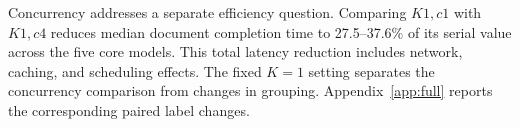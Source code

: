 Concurrency addresses a separate efficiency question. Comparing $K1,c1$ with $K1,c4$ reduces median document completion time to 27.5--37.6\% of its serial value across the five core models. This total latency reduction includes network, caching, and scheduling effects. The fixed $K=1$ setting separates the concurrency comparison from changes in grouping. Appendix~\ref{app:full} reports the corresponding paired label changes.
